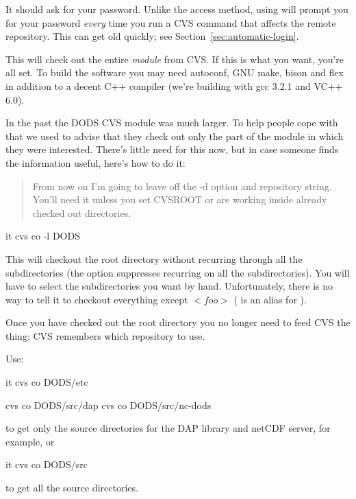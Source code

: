 \documentclass{dods-paper}
\begin{document}
It should ask for your password. Unlike the  access method,
using  will prompt you for your password \emph{every} time you run a
CVS command that affects the remote repository. This can get old quickly;
see Section~\ref{sec:automatic-login}. 

This will check out the entire  \emph{module} from CVS. If this is
what you want, you're all set. To build the software you may need autoconf,
GNU make, bison and flex in addition to a decent C++ compiler (we're building
with gcc 3.2.1 and VC++ 6.0).

In the past the DODS CVS module was much larger. To help people cope with
that we used to advise that they check out only the part of the module in
which they were interested. There's little need for this now, but in case
someone finds the information useful, here's how to do it:

\begin{quote}
From now on I'm going to leave off the -d option and repository string.
You'll need it unless you set CVSROOT or are working inside already checked
out directories.
\end{quote}

\begin{vcode}{it}
cvs co -l DODS
\end{vcode}

This will checkout the root directory without recurring through all the
subdirectories (the  option suppresses recurring on all the
subdirectories). You will have to select the subdirectories you want by hand.
Unfortunately, there is no way to tell it to checkout everything except
$<foo>$ ( is an alias for ).

Once you have checked out the root directory you no longer need to feed CVS
the  thing; CVS remembers which repository to use.

Use:

\begin{vcode}{it}
cvs co DODS/etc

cvs co DODS/src/dap
cvs co DODS/src/nc-dods
\end{vcode}

to get only the source directories for the DAP library and netCDF server, for
example, or

\begin{vcode}{it}
cvs co DODS/src
\end{vcode}

to get all the source directories.
\end{document}
